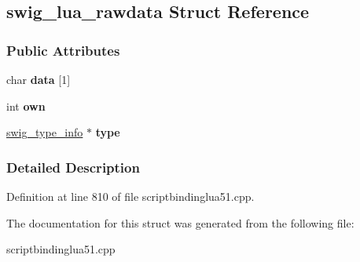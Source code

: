 \hypertarget{structswig__lua__rawdata}{
\subsection{swig\_\-lua\_\-rawdata Struct Reference}
\label{structswig__lua__rawdata}
}
\subsubsection*{Public Attributes}
\begin{DoxyCompactItemize}
\item 
\hypertarget{structswig__lua__rawdata_acbba29d10dcd1b96ba3b8d255b777749}{
char {\bfseries data} \mbox{[}1\mbox{]}}
\label{structswig__lua__rawdata_acbba29d10dcd1b96ba3b8d255b777749}

\item 
\hypertarget{structswig__lua__rawdata_ac52566bcb4a7b4d8421c17d182048924}{
int {\bfseries own}}
\label{structswig__lua__rawdata_ac52566bcb4a7b4d8421c17d182048924}

\item 
\hypertarget{structswig__lua__rawdata_a935edef9803f54e65acaa0ecf8c81ed2}{
\hyperlink{structswig__type__info}{swig\_\-type\_\-info} $\ast$ {\bfseries type}}
\label{structswig__lua__rawdata_a935edef9803f54e65acaa0ecf8c81ed2}

\end{DoxyCompactItemize}


\subsubsection{Detailed Description}


Definition at line 810 of file scriptbindinglua51.cpp.



The documentation for this struct was generated from the following file:\begin{DoxyCompactItemize}
\item 
scriptbindinglua51.cpp\end{DoxyCompactItemize}
